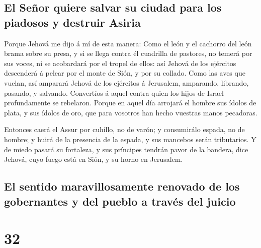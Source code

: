 \hypertarget{el-seuxf1or-quiere-salvar-su-ciudad-para-los-piadosos-y-destruir-asiria}{%
\subsection{El Señor quiere salvar su ciudad para los piadosos y
destruir
Asiria}\label{el-seuxf1or-quiere-salvar-su-ciudad-para-los-piadosos-y-destruir-asiria}}

 Porque Jehová me dijo á mí de esta manera: Como el león y
el cachorro del león brama sobre su presa, y si se llega contra él
cuadrilla de pastores, no temerá por sus voces, ni se acobardará por el
tropel de ellos: así Jehová de los ejércitos descenderá á pelear por el
monte de Sión, y por su collado.  Como las aves que
vuelan, así amparará Jehová de los ejércitos á Jerusalem, amparando,
librando, pasando, y salvando.  Convertíos á aquel contra
quien los hijos de Israel profundamente se rebelaron. 
Porque en aquel día arrojará el hombre sus ídolos de plata, y sus ídolos
de oro, que para vosotros han hecho vuestras manos pecadoras.

 Entonces caerá el Assur por cuhillo, no de varón; y
consumirálo espada, no de hombre; y huirá de la presencia de la espada,
y sus mancebos serán tributarios.  Y de miedo pasará su
fortaleza, y sus príncipes tendrán pavor de la bandera, dice Jehová,
cuyo fuego está en Sión, y su horno en Jerusalem.

\hypertarget{el-sentido-maravillosamente-renovado-de-los-gobernantes-y-del-pueblo-a-travuxe9s-del-juicio}{%
\subsection{El sentido maravillosamente renovado de los gobernantes y
del pueblo a través del
juicio}\label{el-sentido-maravillosamente-renovado-de-los-gobernantes-y-del-pueblo-a-travuxe9s-del-juicio}}

\hypertarget{section-23-32}{%
\section{32}\label{section-23-32}}


